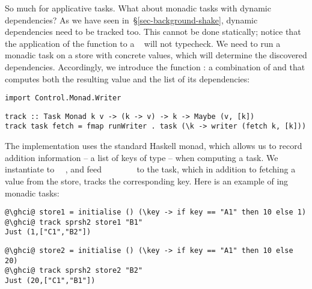 So much for applicative tasks. What about monadic tasks with dynamic
dependencies? As we have seen in~\S\ref{sec-background-shake}, dynamic
dependencies need to be tracked too. This cannot be done statically; notice that
the application of the function  to a ~ will
not typecheck. We need to run a monadic task on a store with concrete values,
which will determine the discovered dependencies. Accordingly, we introduce
the function : a combination of  and 
that computes both the resulting value and the list of its dependencies:

\vspace{1mm}
\begin{verbatim}
import Control.Monad.Writer
\end{verbatim}
\vspace{0.5mm}
\begin{verbatim}
track :: Task Monad k v -> (k -> v) -> k -> Maybe (v, [k])
track task fetch = fmap runWriter . task (\k -> writer (fetch k, [k]))
\end{verbatim}
\vspace{1mm}

\noindent
{}
The implementation uses the standard Haskell  monad, which allows us
to record addition information -- a list of keys of type \hs{[@@k]} -- when
computing a task. We instantiate  to ~\hs{[@@k]}~, and feed
~~\hs{=}~~~~~\hs{[@@k])}
to the task, which in addition to fetching a value from the store, tracks the
corresponding key. Here is an example of ing monadic tasks:

\vspace{1mm}
\begin{verbatim}
@\ghci@ store1 = initialise () (\key -> if key == "A1" then 10 else 1)
@\ghci@ track sprsh2 store1 "B1"
Just (1,["C1","B2"])
\end{verbatim}
\vspace{1mm}
\begin{verbatim}
@\ghci@ store2 = initialise () (\key -> if key == "A1" then 10 else 20)
@\ghci@ track sprsh2 store2 "B2"
Just (20,["C1","B1"])
\end{verbatim}
\vspace{1mm}

